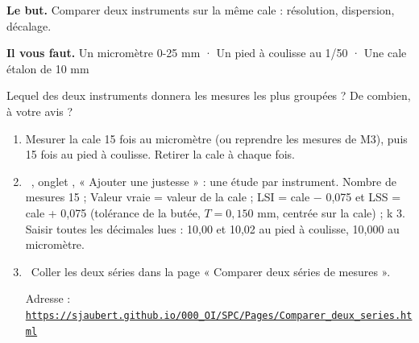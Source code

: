 \documentclass[10pt,a4paper]{article}
\begin{document}
\thispagestyle{fancy}
\begin{tcolorbox}[boite]\textbf{Le but.} Comparer deux instruments sur la même cale : résolution, dispersion, décalage.\par\textbf{Il vous faut.} Un micromètre 0-25 mm · Un pied à coulisse au 1/50 · Une cale étalon de 10 mm\end{tcolorbox}
\begin{tcolorbox}[pred]Lequel des deux instruments donnera les mesures les plus groupées ? De combien, à votre avis ?\reponse\end{tcolorbox}
\begin{enumerate}[label=\textcolor{cyan}{\textbf{\arabic*.}},leftmargin=15pt,itemsep=1.5pt]
\item Mesurer la cale 15 fois au micromètre (ou reprendre les mesures de M3), puis 15 fois au pied à coulisse. Retirer la cale à chaque fois.
\item \tagE\ , onglet , « Ajouter une justesse » : une étude par instrument. Nombre de mesures 15 ; Valeur vraie = valeur de la cale ; LSI = cale $-$ 0,075 et LSS = cale + 0,075 (tolérance de la butée, $T = 0{,}150$ mm, centrée sur la cale) ; k 3. Saisir toutes les décimales lues : 10,00 et 10,02 au pied à coulisse, 10,000 au micromètre.
\item \tagW\ Coller les deux séries dans la page « Comparer deux séries de mesures ».\par Adresse : \href{https://sjaubert.github.io/000_OI/SPC/Pages/Comparer_deux_series.html}{\nolinkurl{https://sjaubert.github.io/000_OI/SPC/Pages/Comparer_deux_series.html}}
\end{enumerate}
\end{document}
